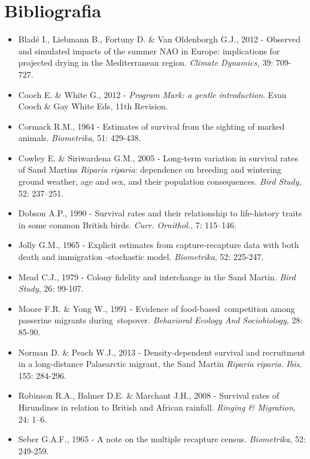 \section*{Bibliografia}
\begin{itemize}
  \item Blad\'e I., Liebmann B., Fortuny D. \& Van Oldenborgh G.J., 2012 -
Observed and simulated impacts of the summer NAO in Europe:
implications for projected drying in the Mediterranean region.
\textit{Climate Dynamics,} 39: 709-727.

  \item Cooch E. \& White G., 2012 - \textit{Program Mark: a gentle
introduction}. Evan Cooch \& Gay White Eds, 11th Revision.

  \item Cormack R.M., 1964 - Estimates of survival from the sighting of marked
animals. \textit{Biometrika}, 51: 429-438.

  \item Cowley E. \& Siriwardena G.M., 2005 - Long-term variation in survival
rates of Sand Martins \textit{Riparia riparia}: dependence on breeding
and wintering ground weather, age and sex, and their population
consequences. \textit{Bird Study, }52: 237--251.

  \item Dobson A.P., 1990 - Survival rates and their relationship to
life-history traits in some common British birds. \textit{Curr.
Ornithol.}, 7: 115--146.

  \item Jolly G.M., 1965 - Explicit estimates from capture-recapture data with
both death and immigration -stochastic model. \textit{Biometrika}, 52:
225-247.

  \item Mead C.J., 1979 - Colony fidelity and interchange in the Sand Martin.
\textit{Bird Study}, 26: 99-107.

  \item Moore F.R. \& Yong W., 1991 - Evidence of food-based~competition among
passerine migrants during~stopover. \textit{Behavioral Ecology And
Sociobiology}, 28: 85-90.

  \item Norman D. \& Peach W.J., 2013 - Density-dependent survival and
recruitment in a long-distance Palaearctic migrant, the Sand Martin
\textit{Riparia riparia}. \textit{Ibis}, 155: 284-296.

  \item Robinson R.A., Balmer D.E. \& Marchant J.H., 2008 - Survival rates of
Hirundines in relation to British and African rainfall. \textit{Ringing
\& Migration}, 24: 1--6.

  \item Seber G.A.F., 1965 - A note on the multiple recapture census.
\textit{Biometrika}, 52: 249-259.
\end{itemize}
